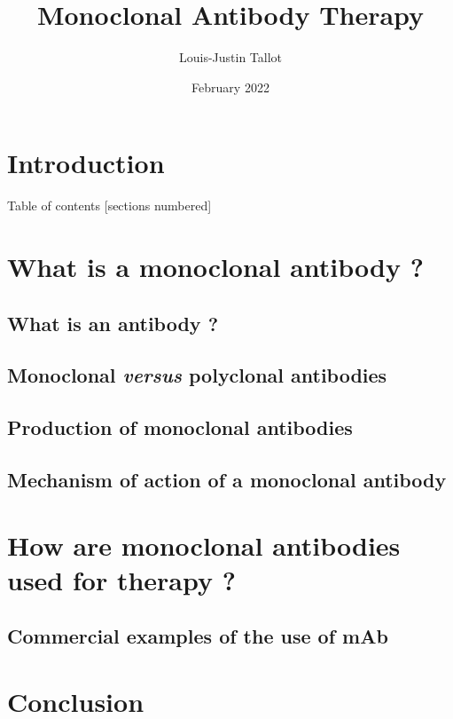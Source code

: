 \documentclass{beamer}
\title{
  \textbf{Monoclonal Antibody Therapy}
}
\author{Louis-Justin Tallot}
\date{February 2022}
\begin{document}
  \maketitle





  \section*{Introduction}
  

  \begin{frame}{Table of contents}
    [sections numbered]
    \tableofcontents
  \end{frame}

  \section{What is a monoclonal antibody ?}

    \subsection{What is an antibody ?}
    

    \subsection{Monoclonal \textit{versus} polyclonal antibodies}
    

    \subsection{Production of monoclonal antibodies}
    

    \subsection{Mechanism of action of a monoclonal antibody}
    

  \section{How are monoclonal antibodies used for therapy ?}


    \subsection{Commercial examples of the use of mAb}
    

  
  
  \section*{Conclusion}
  
\end{document}
